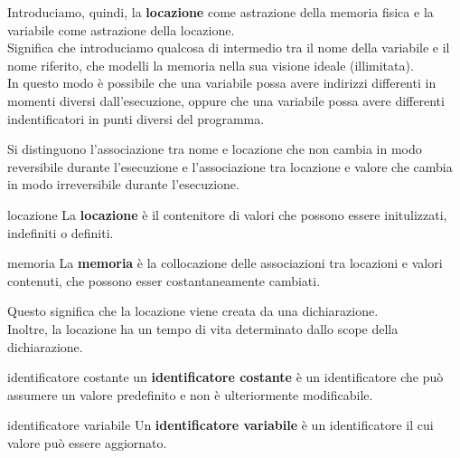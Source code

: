 \smallskip
Introduciamo, quindi, la \textbf{locazione} come astrazione della memoria fisica e la variabile come astrazione della locazione.\\[0.2ex]
Significa che introduciamo qualcosa di intermedio tra il nome della variabile e il nome riferito, che modelli la memoria nella sua visione ideale (illimitata).\\[0.2ex]
In questo modo è possibile che una variabile possa avere indirizzi differenti in momenti diversi dall'esecuzione, oppure che una variabile possa avere differenti indentificatori in punti diversi del programma.


Si distinguono l'associazione tra nome e locazione che non cambia in modo reversibile durante l'esecuzione e l'associazione tra locazione e valore che cambia in modo irreversibile durante l'esecuzione.

\begin{mydef}{locazione}
    La \textbf{locazione} è il contenitore di valori che possono essere initulizzati, indefiniti o definiti.
\end{mydef}

\begin{mydef}{memoria}
    La \textbf{memoria} è la collocazione delle associazioni tra locazioni e valori contenuti, che possono esser costantaneamente cambiati.
\end{mydef}

Questo significa che la locazione viene creata da una dichiarazione.\\[0.2ex]
Inoltre, la locazione ha un tempo di vita determinato dallo scope della dichiarazione.

\begin{mydef}{identificatore costante}
    un \textbf{identificatore costante} è un identificatore che può assumere un valore predefinito e non è ulteriormente modificabile.
\end{mydef}

\begin{mydef}{identificatore variabile}
    Un \textbf{identificatore variabile} è un identificatore il cui valore può essere aggiornato.
\end{mydef}


